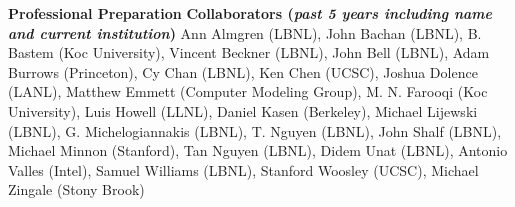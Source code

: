 \documentclass[11pt,letterpaper,english]{article}
\begin{document}
\begin{flushleft} {\bf Professional Preparation}
\vspace{-6pt}
{\bf Collaborators ({\emph{past 5 years including name and current institution}})} 
{\parindent 16pt
Ann Almgren (LBNL),
John Bachan (LBNL),
B. Bastem (Koc University),
Vincent Beckner (LBNL),
John Bell (LBNL),
Adam Burrows (Princeton),
Cy Chan (LBNL),
Ken Chen (UCSC),
Joshua Dolence (LANL),
Matthew Emmett (Computer Modeling Group),
M. N. Farooqi (Koc University),
Luis Howell (LLNL),
Daniel Kasen (Berkeley),
Michael Lijewski (LBNL),
G. Michelogiannakis (LBNL),
T. Nguyen (LBNL),
John Shalf (LBNL),
Michael Minnon (Stanford),
Tan Nguyen (LBNL),
Didem Unat (LBNL),
Antonio Valles (Intel),
Samuel Williams (LBNL),
Stanford Woosley (UCSC),
Michael Zingale (Stony Brook)
}


\end{flushleft}
\end{document}
